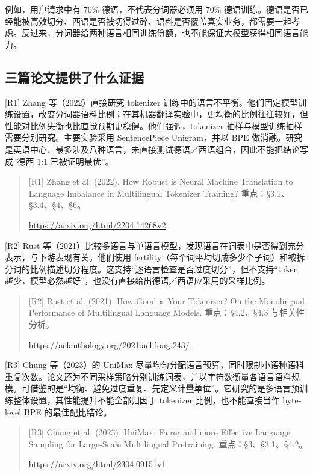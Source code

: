 \documentclass[11pt,a4paper]{article}
\newcommand{\BpeDocCodeInline}[1]{{\ttfamily #1}}
\newcommand{\BpeDocSubsection}[2]{\subsection{\texorpdfstring{#1}{#2}}}
\begin{document}
例如，用户请求中有 70\% 德语，不代表分词器必须用 70\% 德语训练。德语是否已经能被高效切分、西语是否被切得过碎、语料是否覆盖真实业务，都需要一起考虑。反过来，分词器给两种语言相同训练份额，也不能保证大模型获得相同语言能力。


\BpeDocSubsection{三篇论文提供了什么证据}{三篇论文提供了什么证据}


[R1] Zhang 等（2022）直接研究 tokenizer 训练中的语言不平衡。他们固定模型训练设置，改变分词器语料比例；在其机器翻译实验中，更均衡的比例往往较好，但性能对比例失衡也比直觉预期更稳健。他们强调，tokenizer 抽样与模型训练抽样需要分别研究。主要实验采用 SentencePiece Unigram，并以 BPE 做消融。研究是英语中心、最多涉及八种语言，未直接测试德语／西语组合，因此不能把结论写成“德西 1:1 已被证明最优”。


\begin{quote}\footnotesize\setlength{\parskip}{0pt} [R1] Zhang et al. (2022). How Robust is Neural Machine Translation to Language Imbalance in Multilingual \BpeDocCodeInline{Tokenizer} Training? 重点：§3.1、§3.4、§4、§6。
\par\nobreak
\url{https://arxiv.org/html/2204.14268v2}
\end{quote}


[R2] Rust 等（2021）比较多语言与单语言模型，发现语言在词表中是否得到充分表示，与下游表现有关。他们使用 fertility（每个词平均切成多少个子词）和被拆分词的比例描述切分程度。这支持“逐语言检查是否过度切分”，但不支持“\BpeDocCodeInline{token} 越少，模型必然越好”，也没有直接给出德语／西语应采用的采样比例。


\begin{quote}\footnotesize\setlength{\parskip}{0pt} [R2] Rust et al. (2021). How Good is Your \BpeDocCodeInline{Tokenizer}? On the Monolingual Performance of Multilingual Language Models. 重点：§4.2、§4.3 与相关性分析。
\par\nobreak
\url{https://aclanthology.org/2021.acl-long.243/}
\end{quote}


[R3] Chung 等（2023）的 UniMax 尽量均匀分配语言预算，同时限制小语种语料重复次数。论文还为不同采样策略分别训练词表，并以字符数衡量各语言语料规模。可借鉴的是“均衡、避免过度重复、先定义计量单位”。它研究的是多语言预训练整体设置，其性能提升不能全部归因于 tokenizer 比例，也不能直接当作 byte-level BPE 的最佳配比结论。


\begin{quote}\footnotesize\setlength{\parskip}{0pt} [R3] Chung et al. (2023). UniMax: Fairer and more Effective Language Sampling for Large-Scale Multilingual Pretraining. 重点：§3、§3.1、§4.2。
\par\nobreak
\url{https://arxiv.org/html/2304.09151v1}
\end{quote}
\end{document}
